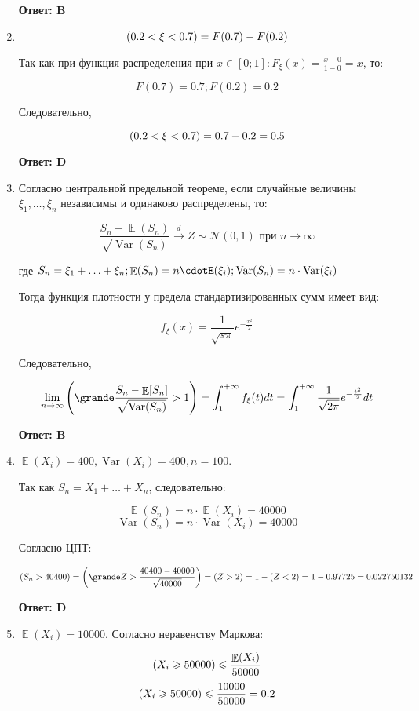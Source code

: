 \documentclass[112pt, cmcyralt]{article}
\DeclareMathOperator{\Var}{Var}
\DeclareMathOperator{\E}{\mathbb{E}}
\let\P\relax
\DeclareMathOperator{\P}{\mathbb{P}}
\newcommand{\cN}{\mathcal{N}}
\begin{document}
\begin{enumerate}
\textbf{Ответ: B}


\item 

\[
\P(0.2<\xi<0.7)=F(0.7)-F(0.2)
\]

Так как при функция распределения при $x \in [0; 1]: F_\xi(x) = \frac{x-0}{1-0}=x$, то:

\[
F(0.7) = 0.7; F(0.2) = 0.2
\]

Следовательно, 

\[
\P(0.2<\xi<0.7) = 0.7-0.2 = 0.5
\]

\textbf{Ответ: D}


\item 

Согласно центральной предельной теореме, если случайные величины $\xi_1,\ldots, \xi_n$  независимы и одинаково распределены, то:

\[
\frac{S_n-\E(S_n)}{\sqrt{\Var(S_n)}} \xrightarrow d Z\sim \cN(0,1) \text{ при } n \rightarrow \infty
\]

где $S_n = \xi_1 + \ldots + \xi_n;
\E(S_n) = n\cdotE(\xi_i);
\Var(S_n) = n\cdot \Var(\xi_i)$

Тогда функция плотности у предела стандартизированных сумм имеет вид:

\[
f_\xi(x)=\frac{1}{\sqrt{s\pi}}e^{-\frac{x^2}{2}}
\]

Следовательно, 

\[
\lim_{n\to\infty}\P\qty(\grande \frac{S_n-\E[S_n]}{\sqrt{\Var(S_n)}}>1)=\int_{1}^{+\infty} f_\xi(t)dt = \int_{1}^{+\infty} \frac{1}{\sqrt{2\pi}}e^{-\frac{t^2}{2}}dt
\]

\textbf{Ответ: B}


\item

$\E(X_i) = 400, \Var(X_i) = 400, n = 100$. 

Так как $S_n = X_1 + \ldots + X_n$, следовательно:

\[
\E(S_n) = n\cdot \E(X_i) = 40000
\]
\[
\Var(S_n) = n\cdot \Var(X_i) = 40000
\]

Согласно ЦПТ:

\[
\P(S_n>40400)=\P\qty(\grande Z>\frac{40400-40000}{\sqrt{40000}}) = \P(Z>2) = 1 -\P(Z<2) = 1 - 0.97725 = 0.022750132
\]

\textbf{Ответ: D}


\item 

$\E(X_i) = 10000$. Согласно неравенству Маркова:

\[
\P(X_i \geqslant 50000) \leqslant \frac{\E(X_i)}{50000}
\]
\[
\P(X_i \geqslant 50000) \leqslant  \frac{10000}{50000} = 0.2
\]


\end{enumerate}
\end{document}
